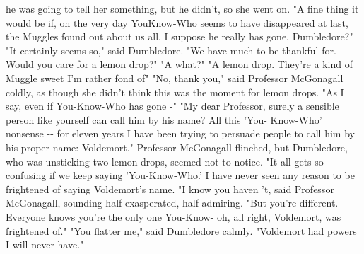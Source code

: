 \documentclass{article}%
\begin{document}
\newline%
he was going to tell her something, but he didn't, so she went on. "A
\newline%
fine thing it would be if, on the very day YouKnow{-}Who seems to have
\newline%
disappeared at last, the Muggles found out about us all. I suppose he
\newline%
really has gone, Dumbledore?"
\newline%
"It certainly seems so," said Dumbledore. "We have much to be thankful
\newline%
for. Would you care for a lemon drop?"
\newline%
"A what?"
\newline%
"A lemon drop. They're a kind of Muggle sweet I'm rather fond of"
\newline%
"No, thank you," said Professor McGonagall coldly, as though she didn't
\newline%
think this was the moment for lemon drops. "As I say, even if
\newline%
You{-}Know{-}Who has gone {-}"
\newline%
"My dear Professor, surely a sensible person like yourself can call him
\newline%
by his name? All this 'You{-} Know{-}Who' nonsense {-}{-} for eleven years I
\newline%
have been trying to persuade people to call him by his proper name:
\newline%
Voldemort." Professor McGonagall flinched, but Dumbledore, who was
\newline%
unsticking two lemon drops, seemed not to notice. "It all gets so
\newline%
confusing if we keep saying 'You{-}Know{-}Who.' I have never seen any reason
\newline%
to be frightened of saying Voldemort's name.
\newline%
"I know you haven 't, said Professor McGonagall, sounding half
\newline%
exasperated, half admiring. "But you're different. Everyone knows you're
\newline%
the only one You{-}Know{-} oh, all right, Voldemort, was frightened of."
\newline%
"You flatter me," said Dumbledore calmly. "Voldemort had powers I will
\newline%
never have."
\newline%
\end{document}
